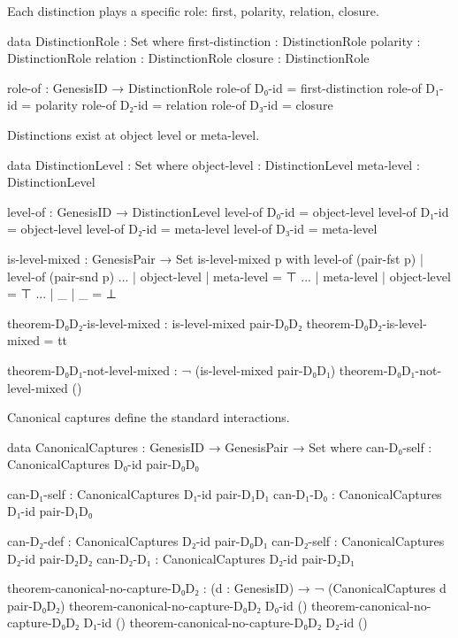 \documentclass[11pt,a4paper]{book}
\begin{document}
Each distinction plays a specific role: first, polarity, relation, closure.

\begin{code}
data DistinctionRole : Set where
  first-distinction : DistinctionRole
  polarity         : DistinctionRole
  relation         : DistinctionRole
  closure          : DistinctionRole

role-of : GenesisID → DistinctionRole
role-of D₀-id = first-distinction
role-of D₁-id = polarity
role-of D₂-id = relation
role-of D₃-id = closure
\end{code}

Distinctions exist at object level or meta-level.

\begin{code}
data DistinctionLevel : Set where
  object-level : DistinctionLevel
  meta-level   : DistinctionLevel

level-of : GenesisID → DistinctionLevel
level-of D₀-id = object-level
level-of D₁-id = object-level  
level-of D₂-id = meta-level
level-of D₃-id = meta-level

is-level-mixed : GenesisPair → Set
is-level-mixed p with level-of (pair-fst p) | level-of (pair-snd p)
... | object-level | meta-level = ⊤
... | meta-level | object-level = ⊤
... | _ | _ = ⊥

theorem-D₀D₂-is-level-mixed : is-level-mixed pair-D₀D₂
theorem-D₀D₂-is-level-mixed = tt

theorem-D₀D₁-not-level-mixed : ¬ (is-level-mixed pair-D₀D₁)
theorem-D₀D₁-not-level-mixed ()

\end{code}

Canonical captures define the standard interactions.

\begin{code}
data CanonicalCaptures : GenesisID → GenesisPair → Set where
  can-D₀-self : CanonicalCaptures D₀-id pair-D₀D₀
  
  can-D₁-self : CanonicalCaptures D₁-id pair-D₁D₁
  can-D₁-D₀   : CanonicalCaptures D₁-id pair-D₁D₀
  
  can-D₂-def  : CanonicalCaptures D₂-id pair-D₀D₁
  can-D₂-self : CanonicalCaptures D₂-id pair-D₂D₂
  can-D₂-D₁   : CanonicalCaptures D₂-id pair-D₂D₁

theorem-canonical-no-capture-D₀D₂ : (d : GenesisID) → ¬ (CanonicalCaptures d pair-D₀D₂)
theorem-canonical-no-capture-D₀D₂ D₀-id ()
theorem-canonical-no-capture-D₀D₂ D₁-id ()
theorem-canonical-no-capture-D₀D₂ D₂-id ()
\end{code}
\end{document}

